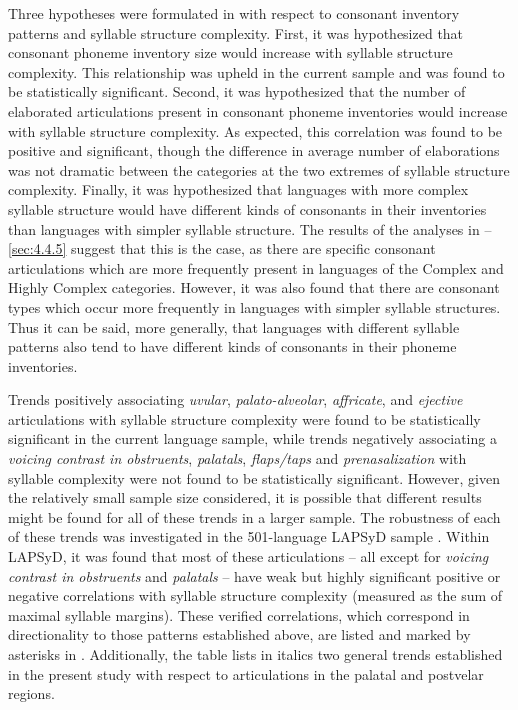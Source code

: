   Three hypotheses were formulated in  with respect to consonant inventory patterns and syllable structure complexity. First, it was hypothesized that consonant phoneme inventory size would increase with syllable structure complexity. This relationship was upheld in the current sample and was found to be statistically significant. Second, it was hypothesized that the number of elaborated articulations present in consonant phoneme inventories would increase with syllable structure complexity. As expected, this correlation was found to be positive and significant, though the difference in average number of elaborations was not dramatic between the categories at the two extremes of syllable structure complexity. Finally, it was hypothesized that languages with more complex syllable structure would have different kinds of consonants in their inventories than languages with simpler syllable structure. The results of the analyses in --\ref{sec:4.4.5} suggest that this is the case, as there are specific consonant articulations which are more frequently present in languages of the Complex and Highly Complex categories. However, it was also found that there are consonant types which occur more frequently in languages with simpler syllable structures. Thus it can be said, more generally, that languages with different syllable patterns also tend to have different kinds of consonants in their phoneme inventories.

  Trends positively associating \textit{uvular}, \textit{palato-alveolar}, \textit{affricate}, and \textit{ejective} articulations with syllable structure complexity were found to be statistically significant in the current language sample, while trends negatively associating a \textit{voicing contrast in obstruents}, \textit{palatals}, \textit{flaps/taps} and \textit{prenasalization} with syllable complexity were not found to be statistically significant. However, given the relatively small sample size considered, it is possible that different results might be found for all of these trends in a larger sample. The robustness of each of these trends was investigated in the 501-language LAPSyD sample \citep{MaddiesonEtAl2013}. Within LAPSyD, it was found that most of these articulations -- all except for \textit{voicing contrast in obstruents} and \textit{palatals} -- have weak but highly significant positive or negative correlations with syllable structure complexity (measured as the sum of maximal syllable margins). These verified correlations, which correspond in directionality to those patterns established above, are listed and marked by asterisks in . Additionally, the table lists in italics two general trends established in the present study with respect to articulations in the palatal and postvelar regions.

